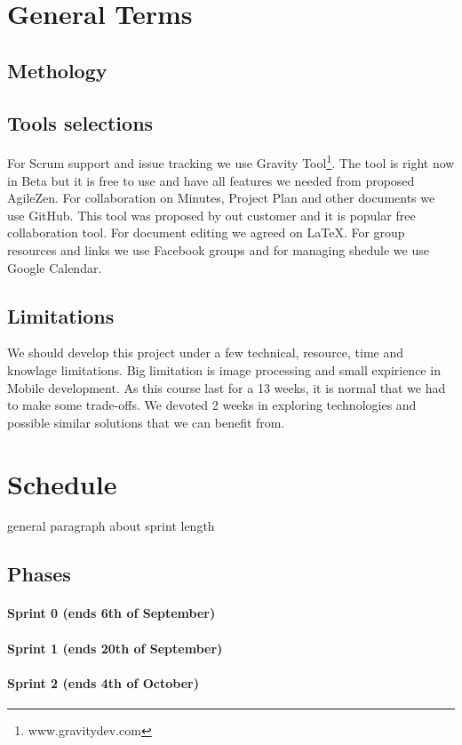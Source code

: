 \documentclass{article}
\begin{document}
\section{General Terms}
\subsection{Methology}

\subsection{Tools selections}
For Scrum support and issue tracking we use Gravity Tool\footnote{www.gravitydev.com}. 
The tool is right now in Beta but it is free to use and have all features we needed from proposed AgileZen.
For collaboration on Minutes, Project Plan and other documents we use GitHub. This tool was proposed by out customer and it is popular free collaboration tool.
For document editing we agreed on LaTeX.
For group resources and links we use Facebook groups and for managing shedule we use Google Calendar.
 
\subsection{Limitations}
We should develop this project under a few technical, resource, time and knowlage limitations. 
Big limitation is image processing and small expirience in Mobile development.
As this course last for a 13 weeks, it is normal that we had to make some trade-offs. We devoted 2 weeks in exploring technologies and possible similar solutions that we can benefit from.
  
  
\section{Schedule}
general paragraph about sprint length
\subsection{Phases}
\paragraph{Sprint 0 (ends 6th of September)}
\paragraph{Sprint 1 (ends 20th of September)}
\paragraph{Sprint 2 (ends 4th of October)}
\end{document}
